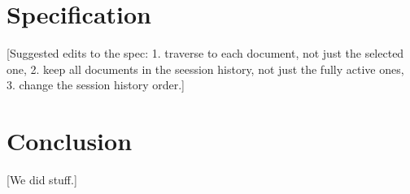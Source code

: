 \documentclass{article}
\begin{document}
\section{Specification}

[Suggested edits to the spec:
  1. traverse to each document, not just the selected one,
  2. keep all documents in the seession history, not just the fully active ones,
  3. change the session history order.]

\section{Conclusion}

[We did stuff.]
\end{document}
